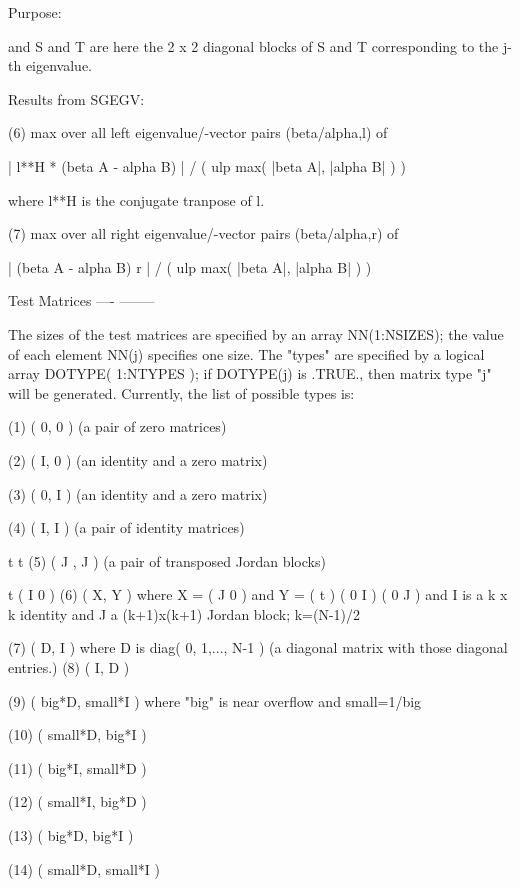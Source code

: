 \begin{DoxyParagraph}{Purpose\+: }
\begin{DoxyVerb}
           and S and T are here the 2 x 2 diagonal blocks of S and T
           corresponding to the j-th eigenvalue.

 Results from SGEGV:

 (6)   max over all left eigenvalue/-vector pairs (beta/alpha,l) of

    | l**H * (beta A - alpha B) | / ( ulp max( |beta A|, |alpha B| ) )

       where l**H is the conjugate tranpose of l.

 (7)   max over all right eigenvalue/-vector pairs (beta/alpha,r) of

       | (beta A - alpha B) r | / ( ulp max( |beta A|, |alpha B| ) )

 Test Matrices
 ---- --------

 The sizes of the test matrices are specified by an array
 NN(1:NSIZES); the value of each element NN(j) specifies one size.
 The "types" are specified by a logical array DOTYPE( 1:NTYPES ); if
 DOTYPE(j) is .TRUE., then matrix type "j" will be generated.
 Currently, the list of possible types is:

 (1)  ( 0, 0 )         (a pair of zero matrices)

 (2)  ( I, 0 )         (an identity and a zero matrix)

 (3)  ( 0, I )         (an identity and a zero matrix)

 (4)  ( I, I )         (a pair of identity matrices)

         t   t
 (5)  ( J , J  )       (a pair of transposed Jordan blocks)

                                     t                ( I   0  )
 (6)  ( X, Y )         where  X = ( J   0  )  and Y = (      t )
                                  ( 0   I  )          ( 0   J  )
                       and I is a k x k identity and J a (k+1)x(k+1)
                       Jordan block; k=(N-1)/2

 (7)  ( D, I )         where D is diag( 0, 1,..., N-1 ) (a diagonal
                       matrix with those diagonal entries.)
 (8)  ( I, D )

 (9)  ( big*D, small*I ) where "big" is near overflow and small=1/big

 (10) ( small*D, big*I )

 (11) ( big*I, small*D )

 (12) ( small*I, big*D )

 (13) ( big*D, big*I )

 (14) ( small*D, small*I )


\end{DoxyVerb}
\end{DoxyParagraph}
